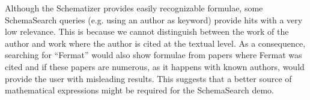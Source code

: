 Although the Schematizer provides easily recognizable formulae, some
\textsf{SchemaSearch} queries (e.g. using an author as keyword) provide hits
with a very low relevance. This is because we cannot distinguish between the
work of the author and work where the author is cited at the textual level. As
a consequence, searching for ``Fermat'' would also show formulae from papers
where Fermat was cited and if these papers are numerous, as it happens with
known authors, would provide the user with misleading results. This suggests
that a better source of mathematical expressions might be required for the
SchemaSearch demo.

\printbibliography



